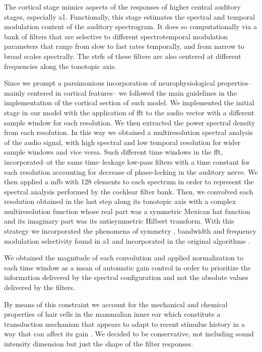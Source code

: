 \documentclass[11pt,a4paper]{article}
\begin{document}
The cortical stage mimics aspects of the responses of higher
central auditory stages, especially \gls{a1}.
Functionally, this stage estimates the
spectral and temporal modulation content of the auditory
spectrogram. It does so computationally via a bank of filters
that are selective to different spectrotemporal modulation parameters
that range from slow to fast rates temporally, and
from narrow to broad scales spectrally. The \glspl{strf}
of these filters are also centered at
different frequencies along the tonotopic axis.

Since we prompt a parsimonious incorporation of neurophysiological
properties--mainly centered in cortical features--
we followed the main guidelines in the implementation of the cortical section of such model. 
We implemented the initial stage in our model with the application of \gls{fft} to the audio vector
with a different sample window for each resolution.
We then extracted the power spectral density from each resolution.
In this way we obtained a multiresolution spectral analysis of the audio signal,
with high spectral and low temporal resolution for wider sample windows and
vice versa.
Such different time windows in the \gls{fft},
incorporated--at the same time--leakage low-pass filters with a time constant for each
resolution accounting for decrease of phase-locking in the auditory nerve.
We then applied a \gls{mfb} with 128 elements to each spectrum
in order to represent the spectral analysis performed by the cochlear filter bank.
Then, we convolved each resolution obtained in the last step along its tonotopic axis
with a complex multiresolution function whose real part
was a symmetric Mexican hat function and its imaginary part was its antisymmetric Hilbert transform.
With this strategy we incorporated the phenomena of symmetry \cite{shamma_1993}, bandwidth \cite{schreiner_1990}
and frequency modulation selectivity \cite{shamma_1993,heil_1992,mendelson_1985}
found in \gls{a1} and incorporated in the original algorithms \cite{wang_1995}.

We obtained the magnitude of each convolution and applied normalization to each time window
as a mean of automatic gain control in order to prioritize the information delivered by the
spectral configuration and not the absolute values delivered by the filters. 

By means of this constraint we account for the mechanical and chemical properties of hair cells in the mammalian inner ear
which constitute a transduction mechanism that appears to adapt to recent stimulus history in a way that can affect its gain
\cite{eatock_2000,holt_2000,le_goff_2005}. 
We decided to be conservative, not including
sound intensity dimension but just the shape of the filter responses.
\end{document}
